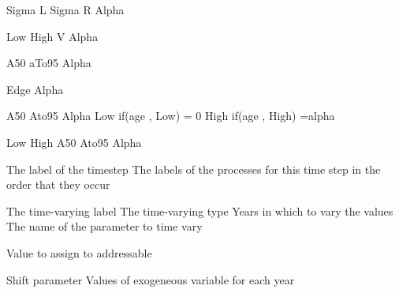  {Sigma L}
 {Sigma R}
 {Alpha}
\par\textbf{}\par
{} {Low}
 {High}
 {V}
 {Alpha}
\par\textbf{}\par
{} {A50}
 {aTo95}
 {Alpha}
\par\textbf{}\par
{} {Edge}
 {Alpha}
\par\textbf{}\par
{} {A50}
 {Ato95}
 {Alpha}
 {Low if(age , Low) = 0}
 {High if(age , High) =alpha}
\par\textbf{}\par
{} {Low}
 {High}
 {A50}
 {Ato95}
 {Alpha}
\par\par
{} {The label of the timestep}
 {The labels of the processes for this time step in the order that they occur}
\par\par
{} {The time-varying label}
 {The time-varying type}
 {Years in which to vary the values}
 {The name of the parameter to time vary}
\par\textbf{}\par
{} {}
 {}
 {}
 {}
 {}
\par\textbf{}\par
{} {Value to assign to addressable}
\par\textbf{}\par
{} {Shift parameter}
 {Values of exogeneous variable for each year}
\par\textbf{}\par
